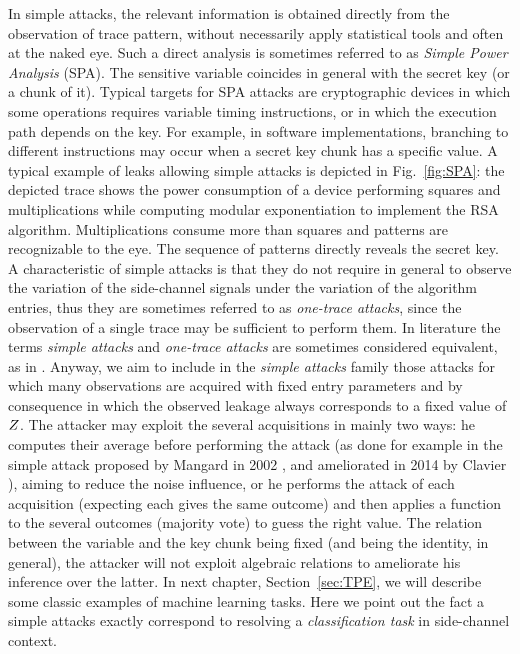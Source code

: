 In simple attacks, the relevant information is obtained directly from the observation of trace pattern, without necessarily apply statistical tools and often at the naked eye. Such a direct analysis is sometimes referred to as \emph{Simple Power Analysis} (SPA). The sensitive variable coincides in general with the secret key (or a chunk of it). Typical targets for SPA attacks are cryptographic devices in which some operations requires variable timing instructions, or in which the execution path depends on the key. For example, in software implementations, branching to different instructions may occur when a secret key chunk has a specific value. A typical example of leaks allowing simple attacks is depicted in Fig.~\ref{fig:SPA}: the depicted trace shows the power consumption of a device performing squares and multiplications while computing modular exponentiation to implement the RSA algorithm. Multiplications consume more than squares and patterns are recognizable to the eye. The sequence of patterns directly reveals the secret key. A characteristic of simple attacks is that they do not require in general to observe the variation of the side-channel signals under the variation of the algorithm entries, thus they are sometimes referred to as \emph{one-trace attacks}, since the observation of a single trace may be sufficient to perform them. In literature the terms \emph{simple attacks} and \emph{one-trace attacks} are sometimes considered equivalent, as \eg in \cite{exponent2012rosetta}. Anyway, we aim to include in the \emph{simple attacks} family those attacks for which many observations are acquired with fixed entry parameters and by consequence in which the observed leakage always corresponds to a fixed value of $Z$. The attacker may exploit the several acquisitions in mainly two ways: he computes their average before performing the attack (as done for example in the simple attack proposed by Mangard in 2002 \cite{mangard2002simple}, and ameliorated in 2014 by Clavier \etal \cite{clavier2014simple}), aiming to reduce the noise influence, or he performs the attack of each acquisition (expecting each gives the same outcome) and then applies a function to the several outcomes (\eg majority vote) to guess the right value. The relation between the variable and the key chunk being fixed (and being the identity, in general), the attacker will not exploit algebraic relations to ameliorate his inference over the latter. In next chapter, Section~\ref{sec:TPE}, we will describe some classic examples of machine learning tasks. Here we point out the fact a simple attacks exactly correspond to resolving a \emph{classification task} in side-channel context. 



